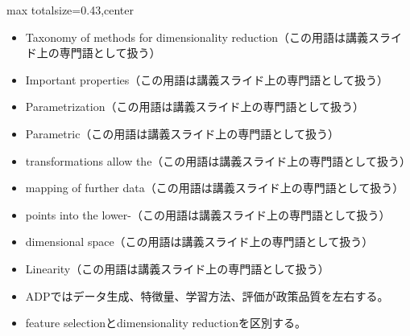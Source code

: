 \clearpage
{}
\begin{minipage}[t]{0.405\textwidth}
\begin{adjustbox}{max totalsize={\textwidth}{0.43\textheight},center}
\begin{minipage}{\textwidth}\scriptsize
{}\begin{itemize}
\item Taxonomy of methods for dimensionality reduction（この用語は講義スライド上の専門語として扱う）
\item Important properties（この用語は講義スライド上の専門語として扱う）
\item Parametrization（この用語は講義スライド上の専門語として扱う）
\item Parametric（この用語は講義スライド上の専門語として扱う）
\item transformations allow the（この用語は講義スライド上の専門語として扱う）
\item mapping of further data（この用語は講義スライド上の専門語として扱う）
\item points into the lower-（この用語は講義スライド上の専門語として扱う）
\item dimensional space（この用語は講義スライド上の専門語として扱う）
\item Linearity（この用語は講義スライド上の専門語として扱う）
\end{itemize}\begin{itemize}
\item ADPではデータ生成、特徴量、学習方法、評価が政策品質を左右する。
\item feature selectionとdimensionality reductionを区別する。
\end{itemize}
\end{minipage}
\end{adjustbox}
\end{minipage}\hfill

